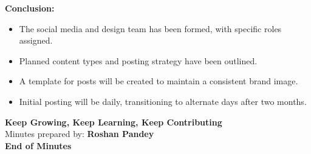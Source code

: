 \documentclass[a4paper,12pt]{article}
\begin{document}
\vspace{0.5cm}

\noindent\textbf{Conclusion:}
\begin{itemize}
    \item The social media and design team has been formed, with specific roles assigned.
    \item Planned content types and posting strategy have been outlined.
    \item A template for posts will be created to maintain a consistent brand image.
    \item Initial posting will be daily, transitioning to alternate days after two months.
\end{itemize}

\vspace{0.5cm}

\begin{center}
    \textbf{Keep Growing, Keep Learning, Keep Contributing}\\
    Minutes prepared by: \textbf{Roshan Pandey} \\
    \textbf{End of Minutes}
\end{center}
\end{document}
